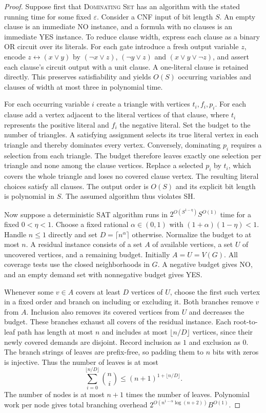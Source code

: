 \documentclass[11pt]{article}
\begin{document}
\begin{proof}
Suppose first that \textsc{Dominating Set} has an algorithm with the stated running time for some fixed $\varepsilon$. Consider a CNF input of bit length $S$. An empty clause is an immediate NO instance, and a formula with no clauses is an immediate YES instance. To reduce clause width, express each clause as a binary OR circuit over its literals. For each gate introduce a fresh output variable $z$, encode $z\leftrightarrow(x\vee y)$ by $(\neg x\vee z)$, $(\neg y\vee z)$ and $(x\vee y\vee\neg z)$, and assert each clause's circuit output with a unit clause. A one-literal clause is retained directly. This preserves satisfiability and yields $O(S)$ occurring variables and clauses of width at most three in polynomial time.

For each occurring variable $i$ create a triangle with vertices $t_i,f_i,p_i$. For each clause add a vertex adjacent to the literal vertices of that clause, where $t_i$ represents the positive literal and $f_i$ the negative literal. Set the budget to the number of triangles. A satisfying assignment selects its true literal vertex in each triangle and thereby dominates every vertex. Conversely, dominating $p_i$ requires a selection from each triangle. The budget therefore leaves exactly one selection per triangle and none among the clause vertices. Replace a selected $p_i$ by $t_i$, which covers the whole triangle and loses no covered clause vertex. The resulting literal choices satisfy all clauses. The output order is $O(S)$ and its explicit bit length is polynomial in $S$. The assumed algorithm thus violates SH.

Now suppose a deterministic SAT algorithm runs in $2^{O(S^{1-\eta})}S^{O(1)}$ time for a fixed $0<\eta<1$. Choose a fixed rational $\alpha\in(0,1)$ with $(1+\alpha)(1-\eta)<1$. Handle $n\le 1$ directly and set $D=\lceil n^\alpha\rceil$ otherwise. Normalize the budget to at most $n$. A residual instance consists of a set $A$ of available vertices, a set $U$ of uncovered vertices, and a remaining budget. Initially $A=U=V(G)$. All coverage tests use the closed neighborhoods in $G$. A negative budget gives NO, and an empty demand set with nonnegative budget gives YES.

Whenever some $v\in A$ covers at least $D$ vertices of $U$, choose the first such vertex in a fixed order and branch on including or excluding it. Both branches remove $v$ from $A$. Inclusion also removes its covered vertices from $U$ and decreases the budget. These branches exhaust all covers of the residual instance. Each root-to-leaf path has length at most $n$ and includes at most $\lfloor n/D\rfloor$ vertices, since their newly covered demands are disjoint. Record inclusion as $1$ and exclusion as $0$. The branch strings of leaves are prefix-free, so padding them to $n$ bits with zeros is injective. Thus the number of leaves is at most
\[
\sum_{i=0}^{\lfloor n/D\rfloor}\binom{n}{i}
\le (n+1)^{1+\lfloor n/D\rfloor}.
\]
The number of nodes is at most $n+1$ times the number of leaves. Polynomial work per node gives total branching overhead $2^{O(n^{1-\alpha}\log(n+2))}B^{O(1)}$.


\end{proof}
\end{document}

